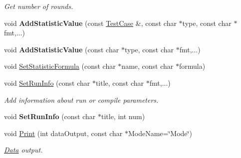 \begin{DoxyCompactItemize}
\begin{DoxyCompactList}\small\item\em Get number of rounds. \end{DoxyCompactList}\item 
\hypertarget{classStatisticsCollector_adc754d0190b1878e5798a9d2f9c39adf}{}void {\bfseries Add\+Statistic\+Value} (const \hyperlink{structStatisticsCollector_1_1TestCase}{Test\+Case} \&, const char $\ast$type, const char $\ast$fmt,...)\label{classStatisticsCollector_adc754d0190b1878e5798a9d2f9c39adf}

\item 
\hypertarget{classStatisticsCollector_a1c42fff3990b4920120150d39864ad48}{}void {\bfseries Add\+Statistic\+Value} (const char $\ast$type, const char $\ast$fmt,...)\label{classStatisticsCollector_a1c42fff3990b4920120150d39864ad48}

\item 
void \hyperlink{classStatisticsCollector_ad8c8ccc4b4eb43d11a4d697b4acc1164}{Set\+Statistic\+Formula} (const char $\ast$name, const char $\ast$formula)
\item 
\hypertarget{classStatisticsCollector_adc74d42a7a3a835a716ae491074f1f7c}{}void \hyperlink{classStatisticsCollector_adc74d42a7a3a835a716ae491074f1f7c}{Set\+Run\+Info} (const char $\ast$title, const char $\ast$fmt,...)\label{classStatisticsCollector_adc74d42a7a3a835a716ae491074f1f7c}

\begin{DoxyCompactList}\small\item\em Add information about run or compile parameters. \end{DoxyCompactList}\item 
\hypertarget{classStatisticsCollector_a70bf5f54d5ce22fbb9a895df4aa97a47}{}void {\bfseries Set\+Run\+Info} (const char $\ast$title, int num)\label{classStatisticsCollector_a70bf5f54d5ce22fbb9a895df4aa97a47}

\item 
\hypertarget{classStatisticsCollector_ac108f2466849d44146ef2e189a5e18e9}{}void \hyperlink{classStatisticsCollector_ac108f2466849d44146ef2e189a5e18e9}{Print} (int data\+Output, const char $\ast$Mode\+Name=\char`\"{}Mode\char`\"{})\label{classStatisticsCollector_ac108f2466849d44146ef2e189a5e18e9}

\begin{DoxyCompactList}\small\item\em \hyperlink{classData}{Data} output. \end{DoxyCompactList}\end{DoxyCompactItemize}
